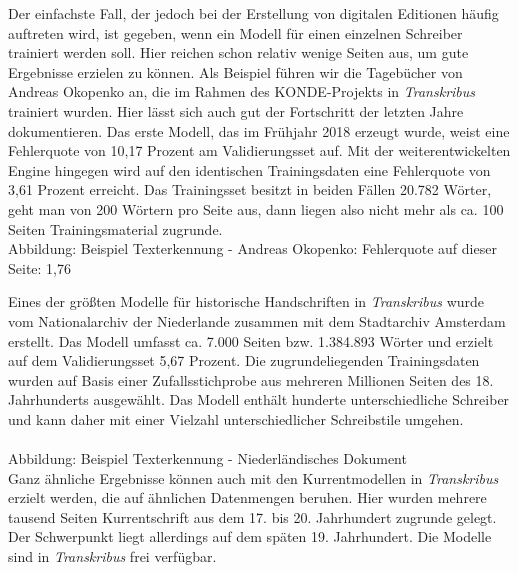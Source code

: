 \documentclass{article}
\begin{document}
        Der einfachste Fall, der jedoch bei der Erstellung von digitalen Editionen häufig
                  auftreten wird, ist gegeben, wenn ein Modell für einen einzelnen Schreiber
                  trainiert werden soll. Hier reichen schon relativ wenige Seiten aus, um gute
                  Ergebnisse erzielen zu können. Als Beispiel führen wir die Tagebücher von Andreas
                  Okopenko an, die im Rahmen des KONDE-Projekts in \emph{Transkribus} trainiert wurden. Hier lässt sich auch gut der Fortschritt
                  der letzten Jahre dokumentieren. Das erste Modell, das im Frühjahr 2018 erzeugt
                  wurde, weist eine Fehlerquote von 10,17 Prozent am Validierungsset auf. Mit der
                  weiterentwickelten Engine hingegen wird auf den identischen Trainingsdaten eine
                  Fehlerquote von 3,61 Prozent erreicht. Das Trainingsset besitzt in beiden Fällen
                  20.782 Wörter, geht man von 200 Wörtern pro Seite aus, dann liegen also nicht mehr
                  als ca. 100 Seiten Trainingsmaterial zugrunde.
               \\
            
        Abbildung: Beispiel Texterkennung - Andreas Okopenko: Fehlerquote auf dieser Seite: 1,76%
            
        Eines der größten Modelle für historische Handschriften in \emph{Transkribus} wurde vom Nationalarchiv der Niederlande zusammen mit dem
                  Stadtarchiv Amsterdam erstellt. Das Modell umfasst ca. 7.000 Seiten bzw. 1.384.893
                  Wörter und erzielt auf dem Validierungsset 5,67 Prozent. Die zugrundeliegenden
                  Trainingsdaten wurden auf Basis einer Zufallsstichprobe aus mehreren Millionen
                  Seiten des 18. Jahrhunderts ausgewählt. Das Modell enthält hunderte
                  unterschiedliche Schreiber und kann daher mit einer Vielzahl unterschiedlicher
                  Schreibstile umgehen.\\
            
        \\
            
        Abbildung: Beispiel Texterkennung - Niederländisches Dokument\\
            
        Ganz ähnliche Ergebnisse können auch mit den Kurrentmodellen in \emph{Transkribus} erzielt werden, die auf ähnlichen Datenmengen beruhen. Hier
                  wurden mehrere tausend Seiten Kurrentschrift aus dem 17. bis 20. Jahrhundert
                  zugrunde gelegt. Der Schwerpunkt liegt allerdings auf dem späten 19. Jahrhundert.
                  Die Modelle sind in \emph{Transkribus} frei verfügbar.\\
            
\end{document}

